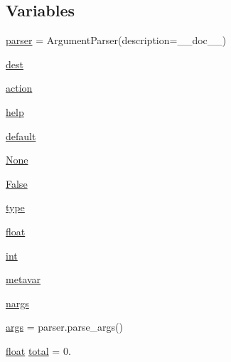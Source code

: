 \subsection*{Variables}
\begin{DoxyCompactItemize}
\item 
\mbox{\hyperlink{namespacepymavlink_1_1tools_1_1magfit__delta_a37f6299e5b342a2c410a0e17c651549b}{parser}} = Argument\+Parser(description=\+\_\+\+\_\+doc\+\_\+\+\_\+)
\item 
\mbox{\hyperlink{namespacepymavlink_1_1tools_1_1magfit__delta_a6b314eb0e469046c618e88543d587e62}{dest}}
\item 
\mbox{\hyperlink{namespacepymavlink_1_1tools_1_1magfit__delta_a445301a481ba8470ed0e71532fa37507}{action}}
\item 
\mbox{\hyperlink{namespacepymavlink_1_1tools_1_1magfit__delta_ad846dac10406554ebeb632b9d3f107b9}{help}}
\item 
\mbox{\hyperlink{namespacepymavlink_1_1tools_1_1magfit__delta_a261fe4d7d621f262d0a009313706fe14}{default}}
\item 
\mbox{\hyperlink{namespacepymavlink_1_1tools_1_1magfit__delta_a6def289bdce6f45dd4680761b183e936}{None}}
\item 
\mbox{\hyperlink{namespacepymavlink_1_1tools_1_1magfit__delta_acd5c17e0195e894925fd65d07bc88e2e}{False}}
\item 
\mbox{\hyperlink{namespacepymavlink_1_1tools_1_1magfit__delta_a681501cd0f73dd27911da6741369837c}{type}}
\item 
\mbox{\hyperlink{namespacepymavlink_1_1tools_1_1magfit__delta_a25223d75e5d8399cfa9e1902af055a4c}{float}}
\item 
\mbox{\hyperlink{namespacepymavlink_1_1tools_1_1magfit__delta_a71974d1f0536d5e2c5c9a3a7a9dae751}{int}}
\item 
\mbox{\hyperlink{namespacepymavlink_1_1tools_1_1magfit__delta_a3d3d19061e2e11e1b90e027dc940cb04}{metavar}}
\item 
\mbox{\hyperlink{namespacepymavlink_1_1tools_1_1magfit__delta_a3aa5f0f50b444c3585dcb7e6d98f692f}{nargs}}
\item 
\mbox{\hyperlink{namespacepymavlink_1_1tools_1_1magfit__delta_a9726a4e5a788a983092e465fb17e912d}{args}} = parser.\+parse\+\_\+args()
\item 
\mbox{\hyperlink{namespacepymavlink_1_1tools_1_1magfit__delta_a25223d75e5d8399cfa9e1902af055a4c}{float}} \mbox{\hyperlink{namespacepymavlink_1_1tools_1_1magfit__delta_a07322551a91ae5be6422fba4ec79f9cc}{total}} = 0.
\end{DoxyCompactItemize}


